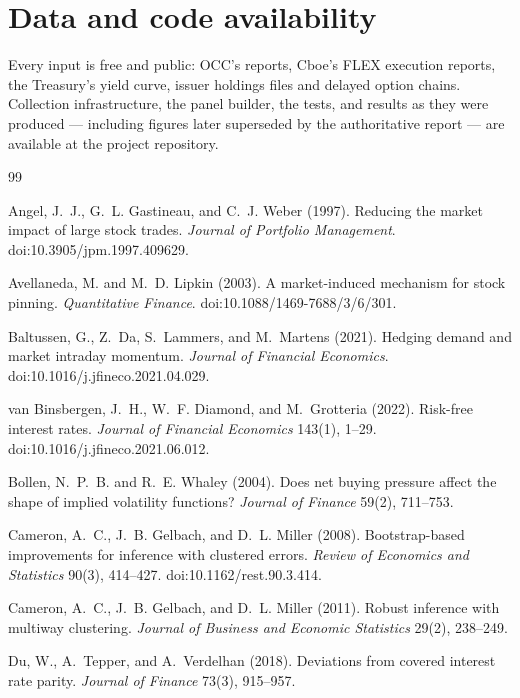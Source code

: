\documentclass[11pt]{article}
\begin{document}
\section*{Data and code availability}

Every input is free and public: OCC's reports, Cboe's FLEX execution reports, the
Treasury's yield curve, issuer holdings files and delayed option chains. Collection
infrastructure, the panel builder, the
tests, and results as they were produced --- including figures later superseded by the
authoritative report --- are available at the project repository.

\begin{thebibliography}{99}

Angel, J.~J., G.~L. Gastineau, and C.~J. Weber (1997).
Reducing the market impact of large stock trades.
\emph{Journal of Portfolio Management}. doi:10.3905/jpm.1997.409629.

Avellaneda, M. and M.~D. Lipkin (2003).
A market-induced mechanism for stock pinning.
\emph{Quantitative Finance}. doi:10.1088/1469-7688/3/6/301.

Baltussen, G., Z.~Da, S.~Lammers, and M.~Martens (2021).
Hedging demand and market intraday momentum.
\emph{Journal of Financial Economics}. doi:10.1016/j.jfineco.2021.04.029.

van Binsbergen, J.~H., W.~F. Diamond, and M.~Grotteria (2022).
Risk-free interest rates.
\emph{Journal of Financial Economics} 143(1), 1--29. doi:10.1016/j.jfineco.2021.06.012.

Bollen, N.~P.~B. and R.~E. Whaley (2004).
Does net buying pressure affect the shape of implied volatility functions?
\emph{Journal of Finance} 59(2), 711--753.

Cameron, A.~C., J.~B. Gelbach, and D.~L. Miller (2008).
Bootstrap-based improvements for inference with clustered errors.
\emph{Review of Economics and Statistics} 90(3), 414--427. doi:10.1162/rest.90.3.414.

Cameron, A.~C., J.~B. Gelbach, and D.~L. Miller (2011).
Robust inference with multiway clustering.
\emph{Journal of Business and Economic Statistics} 29(2), 238--249.

Du, W., A.~Tepper, and A.~Verdelhan (2018).
Deviations from covered interest rate parity.
\emph{Journal of Finance} 73(3), 915--957.


\end{thebibliography}
\end{document}
